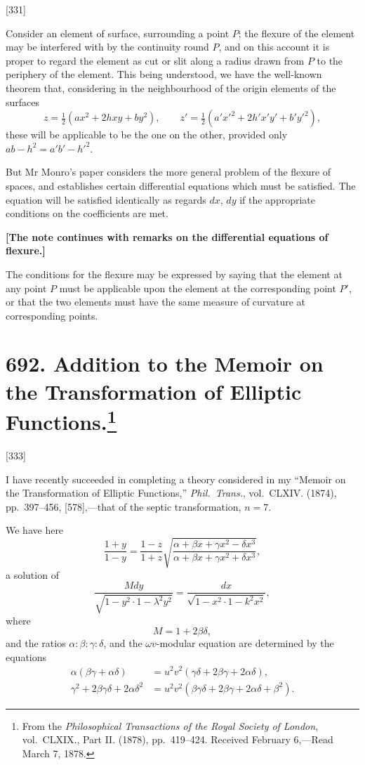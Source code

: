 \documentclass[11pt,a4paper]{book}
\begin{document}
[331]

Consider an element of surface, surrounding a point $P$; the flexure of the element may be interfered with by the continuity round $P$, and on this account it is proper to regard the element as cut or slit along a radius drawn from $P$ to the periphery of the element. This being understood, we have the well-known theorem that, considering in the neighbourhood of the origin elements of the surfaces
\[
z = \tfrac{1}{2}(ax^2 + 2hxy + by^2),\qquad
z' = \tfrac{1}{2}(a'x'^2 + 2h'x'y' + b'y'^2),
\]
these will be applicable to be the one on the other, provided only $ab - h^2 = a'b' - h'^2$.

But Mr Monro's paper considers the more general problem of the flexure of spaces, and establishes certain differential equations which must be satisfied. The equation will be satisfied identically as regards $dx$, $dy$ if the appropriate conditions on the coefficients are met.

\medskip
\noindent\textbf{[The note continues with remarks on the differential equations of flexure.]}

The conditions for the flexure may be expressed by saying that the element at any point $P$ must be applicable upon the element at the corresponding point $P'$, or that the two elements must have the same measure of curvature at corresponding points.

\newpage
\section[Addition to the Memoir on the Transformation of Elliptic Functions]{692. Addition to the Memoir on the Transformation of Elliptic Functions.\footnote{From the \textit{Philosophical Transactions of the Royal Society of London}, vol.\ CLXIX., Part II. (1878), pp.\ 419--424. Received February 6,---Read March 7, 1878.}}

[333]

I have recently succeeded in completing a theory considered in my ``Memoir on the Transformation of Elliptic Functions,'' \textit{Phil.\ Trans.}, vol.\ CLXIV. (1874), pp.\ 397--456, [578],---that of the septic transformation, $n = 7$.

We have here
\[
\frac{1 + y}{1 - y} = \frac{1 - z}{1 + z}\sqrt{\frac{\alpha + \beta x + \gamma x^2 - \delta x^3}{\alpha + \beta x + \gamma x^2 + \delta x^3}},
\]
a solution of
\[
\frac{Mdy}{\sqrt{1 - y^2\cdot 1 - \lambda^2y^2}} = \frac{dx}{\sqrt{1 - x^2\cdot 1 - k^2x^2}},
\]
where
\[
M = 1 + 2\beta\delta,
\]
and the ratios $\alpha : \beta : \gamma : \delta$, and the $\omega v$-modular equation are determined by the equations
\begin{align*}
\alpha(\beta\gamma + \alpha\delta) &= u^2v^2(\gamma\delta + 2\beta\gamma + 2\alpha\delta),\\
\gamma^2 + 2\beta\gamma\delta + 2\alpha\delta^2 &= u^2v^2(\beta\gamma\delta + 2\beta\gamma + 2\alpha\delta + \beta^2).
\end{align*}
\end{document}
